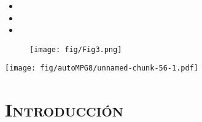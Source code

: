 \begin{itemize}
\tightlist
\item
\item
\item
\end{itemize}

\begin{figure}[h!]
    \centering
    \texttt{[image: fig/Fig3.png]}
    \caption{}
    \label{fig:3}
\end{figure}

\texttt{[image: fig/autoMPG8/unnamed-chunk-56-1.pdf]}

\section*{\centering\scshape\Huge Introducción}
 \normalsize

